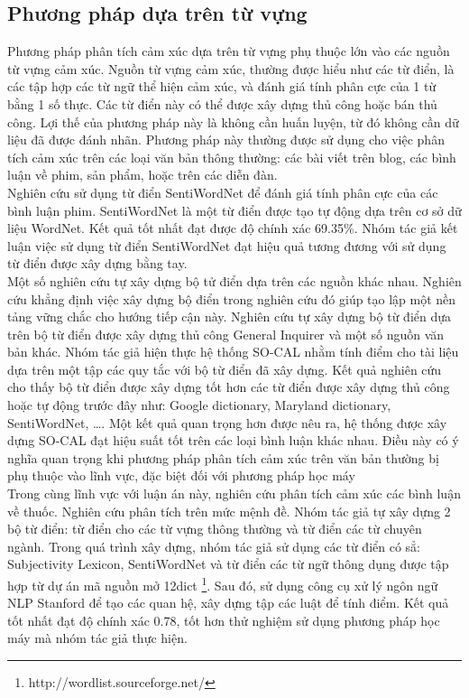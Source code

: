 \subsection{Phương pháp dựa trên từ vựng}
Phương pháp phân tích cảm xúc dựa trên từ vựng phụ thuộc lớn vào các nguồn từ vựng cảm xúc. Nguồn từ vựng cảm xúc, thường được hiểu như các từ điển, là các tập hợp các từ ngữ thể hiện cảm xúc, và đánh giá tính phân cực của 1 từ bằng 1 số thực. Các từ điển này có thể được xây dựng thủ công hoặc bán thủ công. Lợi thế của phương pháp này là không cần huấn luyện, từ đó không cần dữ liệu đã được đánh nhãn. Phương pháp này thường được sử dụng cho việc phân tích cảm xúc trên các loại văn bản thông thường: các bài viết trên blog, các bình luận về phim, sản phẩm, hoặc trên các diễn đàn. \\

Nghiên cứu \cite{ohana2009sentiment} sử dụng từ điển SentiWordNet để đánh giá tính phân cực của các bình luận phim. SentiWordNet là một từ điển được tạo tự động dựa trên cơ sở dữ liệu WordNet. Kết quả tốt nhất đạt được độ chính xác 69.35\%. Nhóm tác giả kết luận việc sử dụng từ điển SentiWordNet đạt hiệu quả tương đương với sử dụng từ điển được xây dựng bằng tay.\\

Một số nghiên cứu tự xây dựng bộ tử điển dựa trên các nguồn khác nhau. Nghiên cứu \cite{taboada2011lexicon} khẳng định việc xây dựng bộ điển trong nghiên cứu đó giúp tạo lập một nền tảng vững chắc cho hướng tiếp cận này. Nghiên cứu tự xây dựng bộ từ điển dựa trên bộ từ điển được xây dựng thủ công General Inquirer và một số nguồn văn bản khác. Nhóm tác giả hiện thực hệ thống SO-CAL nhằm tính điểm cho tài liệu dựa trên một tập các quy tắc với bộ từ điển đã xây dựng. Kết quả nghiên cứu cho thấy bộ từ điển được xây dựng tốt hơn các từ điển được xây dựng thủ công hoặc tự động trước đây như: Google dictionary, Maryland dictionary, SentiWordNet, \ldots. Một kết quả quan trọng hơn được nêu ra, hệ thống được xây dựng SO-CAL đạt hiệu suất tốt trên các loại bình luận khác nhau. Điều này có ý nghĩa quan trọng khi phương pháp phân tích cảm xúc trên văn bản thường bị phụ thuộc vào lĩnh vực, đặc biệt đối với phương pháp học máy \cite{Giachanou2016}\\

Trong cùng lĩnh vực với luận án này, nghiên cứu \cite{na2012sentiment} phân tích cảm xúc các bình luận về thuốc. Nghiên cứu phân tích trên mức mệnh đề. Nhóm tác giả tự xây dựng 2 bộ từ điển: từ điển cho các từ vựng thông thường và từ điển các từ chuyên ngành. Trong quá trình xây dựng, nhóm tác giả sử dụng các từ điển có sẳ:  Subjectivity Lexicon, SentiWordNet và từ điển các từ ngữ thông dụng được tập hợp từ dự án mã nguồn mở 12dict \footnote{http://wordlist.sourceforge.net/}. Sau đó, sử dụng công cụ xử lý ngôn ngữ NLP Stanford để tạo các quan hệ, xây dựng tập các luật để tính điểm. Kết quả tốt nhất đạt độ chính xác 0.78, tốt hơn thử nghiệm sử dụng phương pháp học máy mà nhóm tác giả thực hiện.
